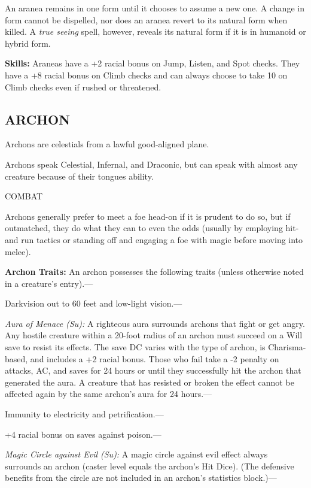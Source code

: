 \documentclass{article}
\begin{document}
An aranea remains in one form until it chooses to assume a new one. A change in 
form cannot be dispelled, nor does an aranea revert to its natural form when killed. 
A \textit{true seeing }spell, however, reveals its natural form if it is in humanoid 
or hybrid form.

\textbf{Skills:} Araneas have a +2 racial bonus on Jump, Listen, and Spot checks. 
They have a +8 racial bonus on Climb checks and can always choose to take 10 on 
Climb checks even if rushed or threatened.

\vspace{12pt}
\subsection*{{\LARGE{}ARCHON}}

Archons are celestials from a lawful good-aligned plane.

Archons speak Celestial, Infernal, and Draconic, but can speak with almost any 
creature because of their tongues ability.

COMBAT

Archons generally prefer to meet a foe head-on if it is prudent to do so, but if 
outmatched, they do what they can to even the odds (usually by employing hit-and 
run tactics or standing off and engaging a foe with magic before moving into melee).

\textbf{Archon Traits:} An archon possesses the following traits (unless otherwise 
noted in a creature's entry).---

Darkvision out to 60 feet and low-light vision.---

\textit{Aura of Menace (Su): }A righteous aura surrounds archons that fight or 
get angry. Any hostile creature within a 20-foot radius of an archon must succeed 
on a Will save to resist its effects. The save DC varies with the type of archon, 
is Charisma-based, and includes a +2 racial bonus. Those who fail take a -2 penalty 
on attacks, AC, and saves for 24 hours or until they successfully hit the archon 
that generated the aura. A creature that has resisted or broken the effect cannot 
be affected again by the same archon's aura for 24 hours.---

Immunity to electricity and petrification.--- 

\parindent=3pt
+4 racial bonus on saves against poison.---

\parindent=0pt
\textit{Magic Circle against Evil (Su): }A magic circle against evil effect always 
surrounds an archon (caster level equals the archon's Hit Dice). (The defensive 
benefits from the circle are not included in an archon's statistics block.)---
\end{document}
